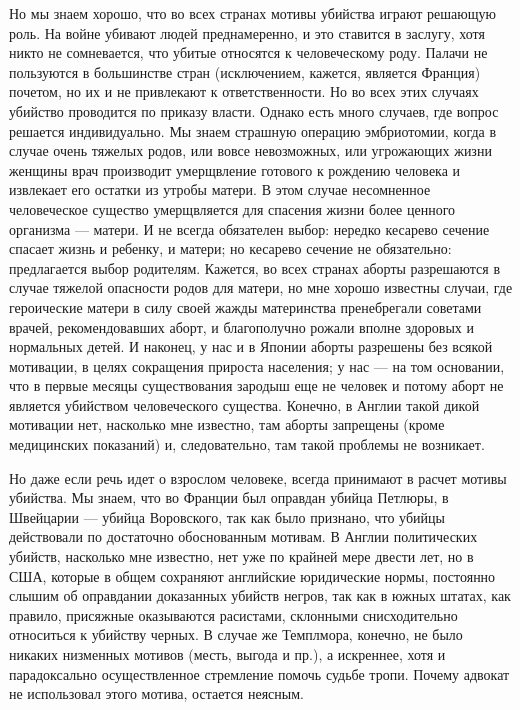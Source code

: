 Но  мы  знаем хорошо,  что  во  всех  странах мотивы  убийства  играют
решающую роль.  На войне убивают  людей преднамеренно, и  это ставится
в  заслугу,  хотя  никто  не   сомневается,  что  убитые  относятся  к
человеческому  роду.   Палачи  не   пользуются  в   большинстве  стран
(исключением,  кажется,   является  Франция)  почетом,  но   их  и  не
привлекают  к  ответственности.  Но  во  всех  этих  случаях  убийство
проводится по  приказу власти. Однако  есть много случаев,  где вопрос
решается индивидуально. Мы знаем  страшную операцию эмбриотомии, когда
в случае  очень тяжелых родов,  или вовсе невозможных,  или угрожающих
жизни женщины врач производит умерщвление готового к рождению человека
и извлекает  его остатки из  утробы матери. В этом  случае несомненное
человеческое существо  умерщвляется для  спасения жизни  более ценного
организма --- матери.  И не всегда обязателен  выбор: нередко кесарево
сечение  спасает жизнь  и ребенку,  и матери;  но кесарево  сечение не
обязательно: предлагается  выбор родителям.  Кажется, во  всех странах
аборты разрешаются в случае тяжелой опасности родов для матери, но мне
хорошо  известны случаи,  где героические  матери в  силу своей  жажды
материнства  пренебрегали советами  врачей,  рекомендовавших аборт,  и
благополучно рожали вполне  здоровых и нормальных детей.  И наконец, у
нас  и  в  Японии  аборты  разрешены без  всякой  мотивации,  в  целях
сокращения  прироста населения;  у нас  ---  на том  основании, что  в
первые месяцы существования  зародыш еще не человек и  потому аборт не
является  убийством человеческого  существа. Конечно,  в Англии  такой
дикой  мотивации нет,  насколько  мне известно,  там аборты  запрещены
(кроме медицинских показаний) и,  следовательно, там такой проблемы не
возникает.

Но даже если речь идет о  взрослом человеке, всегда принимают в расчет
мотивы убийства. Мы знаем, что во Франции был оправдан убийца Петлюры,
в Швейцарии ---  убийца Воровского, так как было  признано, что убийцы
действовали по достаточно обоснованным  мотивам. В Англии политических
убийств, насколько мне  известно, нет уже по крайней  мере двести лет,
но  в США,  которые в  общем сохраняют  английские юридические  нормы,
постоянно слышим  об оправдании доказанных  убийств негров, так  как в
южных штатах, как правило,  присяжные оказываются расистами, склонными
снисходительно относиться  к убийству  черных. В случае  же Темплмора,
конечно, не  было никаких низменных  мотивов (месть, выгода и  пр.), а
искреннее,  хотя  и  парадоксально  осуществленное  стремление  помочь
судьбе  тропи. Почему  адвокат не  использовал этого  мотива, остается
неясным.

